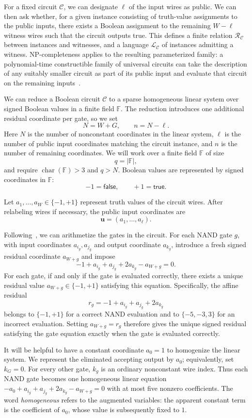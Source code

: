 \documentclass[11pt]{article}
\theoremstyle{definition}
\newcommand{\F}{\mathbb F}
\newcommand{\cC}{\mathcal C}
\newcommand{\cR}{\mathcal R}
\newcommand{\cL}{\mathcal L}
\begin{document}
For a fixed circuit $\cC$, we can designate $\ell$ of the input wires as public. We can then ask whether, for a given instance consisting of truth-value assignments to the public inputs, there exists a Boolean assignment to the remaining $W-\ell$ witness wires such that the circuit outputs true. This defines a finite relation $\cR_{\cC}$ between instances and witnesses, and a language $\cL_{\cC}$ of instances admitting a witness. NP-completeness applies to the resulting parameterized family: a polynomial-time constructible family of universal circuits can take the description of any suitably smaller circuit as part of its public input and evaluate that circuit on the remaining inputs~\cite{Valiant76}.

We can reduce a Boolean circuit $\cC$ to a sparse homogeneous linear system over signed Boolean values in a finite field $\F$. The reduction introduces one additional residual coordinate per gate, so
we set
\[
  N=W+G,
  \qquad
  n=N-\ell.
\]
Here $N$ is the number of nonconstant coordinates in the linear system, $\ell$ is the number of public input coordinates matching the circuit instance, and $n$ is the number of remaining coordinates. We will work over a finite field $\F$ of size
\[
  q=|\F|,
\]
and require $\operatorname{char}(\F)>3$ and $q>N$. Boolean values are
represented by signed coordinates in $\F$:
\[
  -1=\mathsf{false},
  \qquad
  +1=\mathsf{true}.
\]

Let $a_1,\ldots,a_W\in \{-1,+1\}$ represent truth values of the circuit wires.
After relabeling wires if necessary, the public input coordinates are
\[
  \mathbf u=(a_1,\ldots,a_\ell).
\]

Following~\cite{GOS06}, we can arithmetize the gates in the circuit. For each NAND gate $g$, with input coordinates $a_{i_g},a_{j_g}$ and output
coordinate $a_{k_g}$, introduce a fresh signed residual coordinate $a_{W+g}$ and
impose
\[
  -1+a_{i_g}+a_{j_g}+2a_{k_g}-a_{W+g}=0.
\]
For each gate, if and only if the gate is evaluated correctly, there exists a unique residual value $a_{W+g}\in\{-1,+1\}$ satisfying this equation. Specifically, the affine residual
\[
  r_g=-1+a_{i_g}+a_{j_g}+2a_{k_g}
\]
belongs to $\{-1,+1\}$ for a correct NAND evaluation and to
$\{-5,-3,3\}$ for an incorrect evaluation.  Setting $a_{W+g}=r_g$ therefore
gives the unique signed residual satisfying the gate equation exactly when the
gate is evaluated correctly.

It will be helpful to have a constant coordinate $a_0=1$ to homogenize the
linear system.  We represent the eliminated accepting output by $a_0$;
equivalently, set $k_G=0$.  For every other gate, $k_g$ is an ordinary
nonconstant wire index.
Thus each NAND gate becomes one homogeneous linear equation $-a_0+a_{i_g}+a_{j_g}+2a_{k_g}-a_{W+g}=0$ with at most five
nonzero coefficients. The word \emph{homogeneous} refers to the augmented
variables: the apparent constant term is the coefficient of $a_0$, whose value
is subsequently fixed to $1$.
\end{document}
